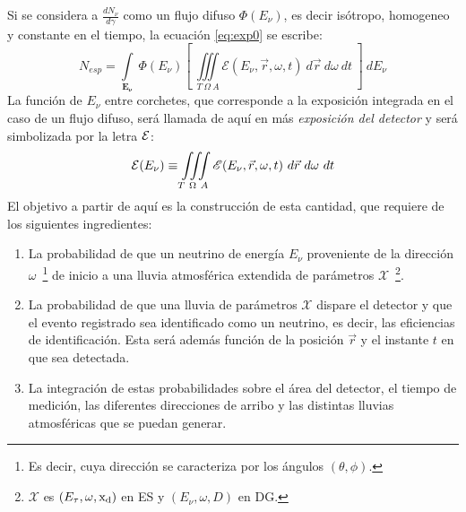 	Si se considera a $\frac{dN_{\nu}}{d\gamma}$ como un flujo difuso $\Phi(E_{\nu})$, es decir isótropo, homogeneo y constante en el tiempo, la ecuación \ref{eq:exp0} se escribe:
	\begin{equation}
	 N_{esp}=\int\limits_{\mathbf{E_{\nu}}}~\Phi(E_{\nu})\left[~\iiint\limits_{T~\Omega~A}\mathscr{E}(E_{\nu},\vec{r},\omega,t) ~d\vec{r}~d\omega~dt~\right]~dE_\nu
	 \label{eq:exp1}
	\end{equation}
	La función de $E_\nu$ entre corchetes, que corresponde a la exposición integrada en el caso de un flujo difuso, será llamada de aquí en más \emph{exposición del detector} y será simbolizada por la letra $\cal E$:
	\begin{equation}
	 {\cal E}(E_\nu)\equiv\iiint\limits_{T~\Omega~A}\mathscr{E}(E_{\nu},\vec{r},\omega,t) ~d\vec{r}~d\omega~dt
	 \label{eq:exp2}
	\end{equation}
	El objetivo a partir de aquí es la construcción de esta cantidad, que requiere de los siguientes ingredientes:
	\begin{enumerate}
	 \item La probabilidad de que un neutrino de energía $E_\nu$ proveniente de la direcci\'on  $\omega$~\footnote{Es decir, cuya dirección se caracteriza por los ángulos $(\theta,\phi)$.} de inicio a una lluvia atmosférica extendida de parámetros $\mathcal{X}$~\footnote{$\mathcal{X}$ es $(E_\tau,\omega,{\rm x_d})$ en ES y $(E_\nu,\omega,D)$ en DG.}.
	 \item La probabilidad de que una lluvia de parámetros $\mathcal{X}$ dispare el detector y que el evento registrado sea identificado como un neutrino, es decir, las eficiencias de identificación. Esta ser\'a adem\'as funci\'on de la posici\'on $\vec{r}$ y el instante $t$ en que sea detectada.
	 \item La integración de estas probabilidades sobre el área del detector, el tiempo de medición, las diferentes direcciones de arribo y las distintas lluvias atmosféricas que se puedan generar.
	\end{enumerate}
	
